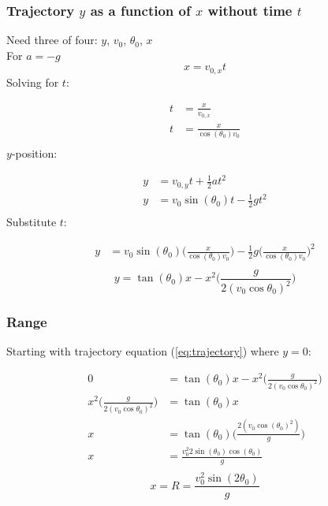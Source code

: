 \documentclass{article}
\numberwithin{equation}{section}
\begin{document}
 \subsubsection{Trajectory $y$ as a function of $x$ without time $t$}
 Need three of four: $y$, $v_{0}$, $\theta_{0}$, $x$\\
 For $a = -g$
 \[
    x = v_{0,x}t
\] 
Solving for $t$:
 
\[
  \begin{aligned}
    t &= \frac{x}{v_{0,x}} \\
    t &= \frac{x}{\cos(\theta_{0})v_{0}} \\
  \end{aligned}
\]
$y$-position:
 
\[
  \begin{aligned}
    y &= v_{0,y}t + \frac{1}{2}at^2 \\
    y &= v_{0}\sin(\theta_{0})t - \frac{1}{2}gt^2 \\
  \end{aligned}
\]
Substitute $t$:
 
\[
  \begin{aligned}
    y &= v_{0}\sin(\theta_{0}) \bigg( \frac{x}{\cos(\theta_{0})v_{0}} \bigg) -
    \frac{1}{2}g \bigg( \frac{x}{\cos(\theta_{0})v_{0}} \bigg)^2 \\
  \end{aligned}
\]
\begin{equation}\label{eq:trajectory}
  \boxed{    y = \tan(\theta_{0})x - x^2 \bigg( \frac{g}{2(v_{0} \cos\theta_{0} )^2} \bigg)}
\end{equation}
 \subsubsection{Range}
 Starting with trajectory equation (\ref{eq:trajectory}) where $y=0$:
 
\[
  \begin{aligned}
    0 &= \tan(\theta_{0})x - x^2 \bigg( \frac{g}{2(v_{0} \cos\theta_{0} )^2} \bigg) \\
    x^2 \bigg( \frac{g}{2(v_{0} \cos\theta_{0} )^2} \bigg) &=
    \tan(\theta_{0})x\\
    x  &= \tan(\theta_{0}) \bigg( \frac{2(v_{0}\cos(\theta_{0})^2)}{g} \bigg) \\
    x &= \frac{v_{0}^2 2\sin(\theta_{0})\cos(\theta_{0})}{g}\\ 
  \end{aligned}
\]
  \begin{equation}\label{eq:range}
    \boxed{    x = R = \frac{v_{0}^2 \sin(2\theta_{0})}{g} }
  \end{equation}
\end{document}
